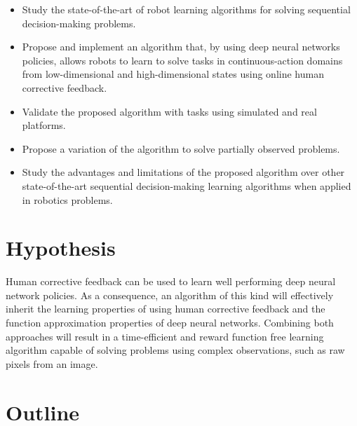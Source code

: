 \begin{intro}
\begin{itemize}
    \item Study the state-of-the-art of robot learning algorithms for solving sequential decision-making problems.
    \item Propose and implement an algorithm that, by using deep neural networks policies, allows robots to learn to solve tasks in continuous-action domains from low-dimensional and high-dimensional states using online human corrective feedback. 
    \item Validate the proposed algorithm with tasks using simulated and real platforms.
    \item Propose a variation of the algorithm to solve partially observed problems.
    \item Study the advantages and limitations of the proposed algorithm over other state-of-the-art sequential decision-making learning algorithms when applied in robotics problems. 
\end{itemize}

\section{Hypothesis}
Human corrective feedback can be used to learn well performing deep neural network policies. As a consequence, an algorithm of this kind will effectively inherit the learning properties of using human corrective feedback and the function approximation properties of deep neural networks. Combining both approaches will result in a time-efficient and reward function free learning algorithm capable of solving problems using complex observations, such as raw pixels from an image.

\section{Outline}
\end{intro}